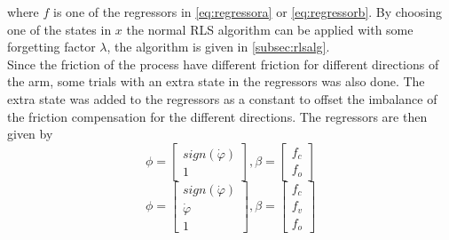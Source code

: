 \documentclass[10pt,a4paper]{article}
\begin{document}
where $f$ is one of the regressors in \ref{eq:regressora} or \ref{eq:regressorb}. By choosing one of the states in $x$ the normal RLS algorithm can be applied with some forgetting factor $\lambda$, the algorithm is given in \ref{subsec:rlsalg}.
\\
Since the friction of the process have different friction for different directions of the arm, some trials with an extra state in the regressors was also done. The extra state was added to the regressors as a constant to offset the imbalance of the friction compensation for the different directions. The regressors are then given by 
\begin{equation}
\phi=\begin{bmatrix}
sign(\dot{\varphi}) \\
1
\end{bmatrix}, \beta = \begin{bmatrix}
f_c\\
f_o
\end{bmatrix}
\label{eq:regressora}
\end{equation}
\begin{equation}
\phi=\begin{bmatrix}
sign(\dot{\varphi}) \\
\dot{\varphi} \\
1
\end{bmatrix}, \beta = \begin{bmatrix}
f_c\\
f_v\\
f_o
\end{bmatrix}
\label{eq:regressorb}
\end{equation} 


\end{document}
